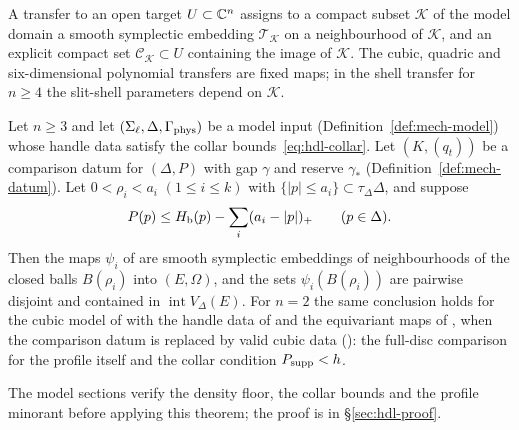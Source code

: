 \begin{definition}[Transfer]\label{def:mech-transfer}
A transfer to an open target $U\subset\mathbb{C}^n$ assigns to a compact subset $\mathcal K$ of the model
domain a smooth symplectic embedding $\mathcal T_{\mathcal K}$ on a neighbourhood of $\mathcal K$,
and an explicit compact set $\mathcal C_{\mathcal K}\subset U$ containing the image of $\mathcal K$.
The cubic, quadric and six-dimensional polynomial transfers are fixed maps; in the shell transfer for
$n\ge4$ the slit-shell parameters depend on $\mathcal K$.
\end{definition}

\begin{theorem}\label{thm:mech-packing}
Let $n\ge3$ and let $(\Sigma_\ell,\Delta,\Gamma_{\rm phys})$ be a model input
(Definition~\ref{def:mech-model}) whose handle data satisfy the collar bounds~\eqref{eq:hdl-collar}. Let
$(K,(q_t))$ be a comparison datum for $(\Delta,P)$ with gap $\gamma$ and reserve $\gamma_*$
(Definition~\ref{def:mech-datum}). Let $0<\rho_i<a_i$ $(1\le i\le k)$ with
$\{|p|\le a_i\}\subset\tau_\Delta\Delta$, and suppose
\[
 P(p)\le H_{\mathrm b}(p)-\sum_i(a_i-|p|)_+\qquad(p\in\Delta).
\]
Then the maps $\psi_i$ of  are smooth symplectic embeddings of
neighbourhoods of the closed balls $B(\rho_i)$ into $(E,\Omega)$, and the sets $\psi_i(B(\rho_i))$ are pairwise
disjoint and contained in $\operatorname{int}V_\Delta(E)$. For $n=2$ the same conclusion holds for the cubic
model of  with the handle data of  and the
equivariant maps of , when the comparison datum is replaced by valid cubic data
(): the full-disc comparison for the profile itself and the collar condition
$P_{\rm supp}<h$.
\end{theorem}

The model sections verify the density floor, the collar bounds and the profile minorant before applying
this theorem; the proof is in \S\ref{sec:hdl-proof}.

